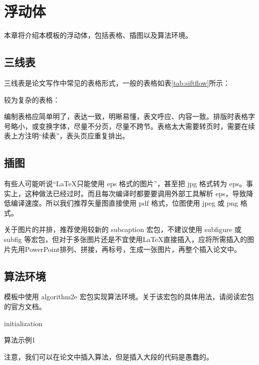 \chapter{浮动体}
\label{cha:float}
本章将介绍本模板的浮动体，包括表格、插图以及算法环境。
\section{三线表}
\label{sec:sheet}
三线表是论文写作中常见的表格形式，一般的表格如表\ref{tab:siftflow}所示：


较为复杂的表格：


编制表格应简单明了，表达一致，明晰易懂，表文呼应、内容一致。排版时表格字号略小，或变换字体，尽量不分页，尽量不跨节。表格太大需要转页时，需要在续表上方注明“续表”，表头页应重复排出。

\section{插图}
\label{sec:figure}
有些人可能听说“\LaTeX 只能使用 eps 格式的图片”，甚至把 jpg 格式转为 eps。事实上，这种做法已经过时。而且每次编译时都要要调用外部工具解析 eps，导致降低编译速度。所以我们推荐矢量图直接使用 pdf 格式，位图使用 jpeg 或 png 格式。


关于图片的并排，推荐使用较新的 subcaption 宏包，不建议使用 subfigure 或 subfig 等宏包，但对于多张图片还是不宜使用\LaTeX 直接插入，应将所需插入的图片先用PowerPoint排列、拼接，再标号，生成一张图片，再整个插入论文中。

\section{算法环境}
\label{sec:algorithm}
模板中使用 algorithm2e 宏包实现算法环境。关于该宏包的具体用法，请阅读宏包的官方文档。

\normalem
\begin{algorithm}[h]
	\SetAlgoLined
  
	initialization\;
	\caption{算法示例1}
	\label{algo:algorithm1}
  \end{algorithm}
  \ULforem

  注意，我们可以在论文中插入算法，但是插入大段的代码是愚蠢的。